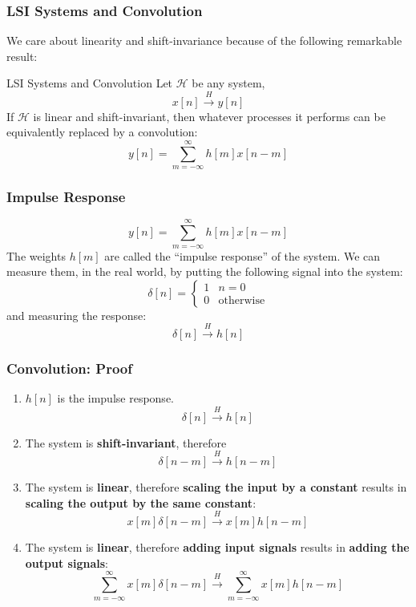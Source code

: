 \documentclass{beamer}
\begin{document}
\begin{frame}
  \frametitle{LSI Systems and Convolution}

  We care about linearity and shift-invariance because of the
  following remarkable result:
  \begin{block}{LSI Systems and Convolution}
    Let ${\mathcal H}$ be any system,
    \[
    x[n]\stackrel{H}{\longrightarrow} y[n]
    \]
    If ${\mathcal H}$ is linear and shift-invariant, then whatever
    processes it performs can be equivalently replaced by a convolution:
    \[
    y[n] = \sum_{m=-\infty}^\infty h[m] x[n-m]
    \]
  \end{block}
\end{frame}

\begin{frame}
  \frametitle{Impulse Response}

  \[
  y[n] = \sum_{m=-\infty}^\infty h[m] x[n-m]
  \]
  The weights $h[m]$ are called the ``impulse response'' of the system.  We can
  measure them, in the real world, by putting the following signal into the system:
  \[
  \delta[n] = \begin{cases}
    1 & n=0\\
    0 & \mbox{otherwise}
  \end{cases}
  \]
  and measuring the response:
  \[
  \delta[n] \stackrel{H}{\longrightarrow} h[n]
  \]
\end{frame}



\begin{frame}
  \frametitle{Convolution: Proof}
  \begin{enumerate}
  \item $h[n]$ is the impulse response.
    \[
    \delta[n] \stackrel{H}{\longrightarrow} h[n]
    \]
  \item The system is {\bf shift-invariant}, therefore
    \[
    \delta[n-m] \stackrel{H}{\longrightarrow} h[n-m]
    \]
  \item The system is {\bf linear}, therefore {\bf scaling the input
    by a constant} results in {\bf scaling the output by the same
    constant}:
    \[
    x[m]\delta[n-m] \stackrel{H}{\longrightarrow} x[m]h[n-m]
    \]
  \item The system is {\bf linear}, therefore {\bf adding input
    signals} results in {\bf adding the output signals}:
    \[
    \sum_{m=-\infty}^\infty x[m]\delta[n-m] \stackrel{H}{\longrightarrow} \sum_{m=-\infty}^\infty x[m]h[n-m]
    \]
  \end{enumerate}
\end{frame}
\end{document}
